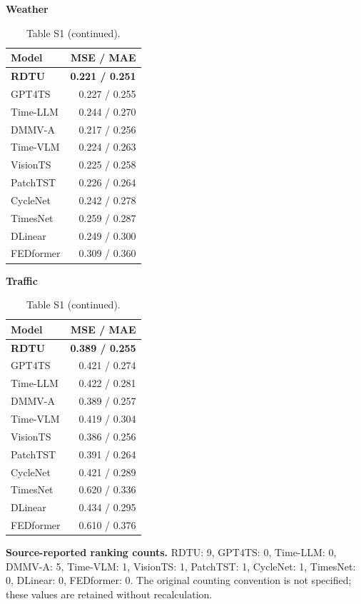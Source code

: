 \begin{table}[H]\centering\small
\caption*{Table S1 (continued).}
\begin{minipage}[t]{0.48\linewidth}\vspace{0pt}\centering\small
\textbf{Weather}\par\smallskip
\begin{tabular}{lr}\toprule Model & MSE / MAE\\\midrule
\rowcolor{blue!5}
\textbf{RDTU} & \textbf{0.221 / 0.251}\\
GPT4TS & 0.227 / 0.255\\
Time-LLM & 0.244 / 0.270\\
DMMV-A & 0.217 / 0.256\\
Time-VLM & 0.224 / 0.263\\
VisionTS & 0.225 / 0.258\\
PatchTST & 0.226 / 0.264\\
CycleNet & 0.242 / 0.278\\
TimesNet & 0.259 / 0.287\\
DLinear & 0.249 / 0.300\\
FEDformer & 0.309 / 0.360\\
\bottomrule\end{tabular}\end{minipage}\hfill\begin{minipage}[t]{0.48\linewidth}\vspace{0pt}\centering\small
\textbf{Traffic}\par\smallskip
\begin{tabular}{lr}\toprule Model & MSE / MAE\\\midrule
\rowcolor{blue!5}
\textbf{RDTU} & \textbf{0.389 / 0.255}\\
GPT4TS & 0.421 / 0.274\\
Time-LLM & 0.422 / 0.281\\
DMMV-A & 0.389 / 0.257\\
Time-VLM & 0.419 / 0.304\\
VisionTS & 0.386 / 0.256\\
PatchTST & 0.391 / 0.264\\
CycleNet & 0.421 / 0.289\\
TimesNet & 0.620 / 0.336\\
DLinear & 0.434 / 0.295\\
FEDformer & 0.610 / 0.376\\
\bottomrule\end{tabular}\end{minipage}
\end{table}
\noindent\textbf{Source-reported ranking counts.} RDTU: 9, GPT4TS: 0, Time-LLM: 0, DMMV-A: 5, Time-VLM: 1, VisionTS: 1, PatchTST: 1, CycleNet: 1, TimesNet: 0, DLinear: 0, FEDformer: 0. The original counting convention is not specified; these values are retained without recalculation.\par

